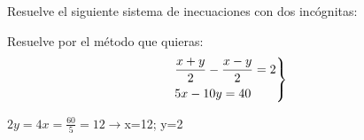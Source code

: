 \documentclass[addpoints,spanish, 12pt,a4paper]{exam}
\begin{document}
\begin{questions}
\question Resuelve el siguiente sistema de inecuaciones con dos incógnitas: 



\question[1] Resuelve por el método que quieras:
$$\left. \begin{gathered}
	  \frac{{x + y}}{2} - \frac{{x - y}}{2} = 2 \hfill \\
	  5x - 10y = 40 \hfill \\ 
	\end{gathered}  \right\rbrace$$
	\begin{solution}  $2y=4 x=\frac{60}{5}=12 \to $x=12; y=2 \end{solution}
	


\end{questions}
\end{document}
